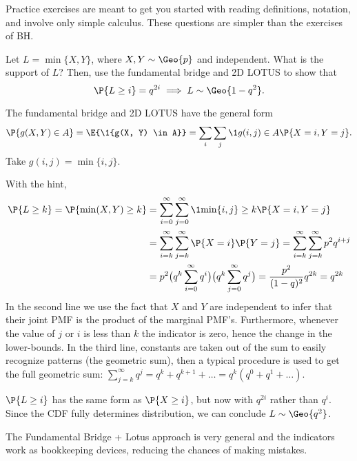 Practice exercises are meant to get you started with reading definitions, notation, and involve only simple calculus.
These questions are simpler than the exercises of BH.

\begin{exercise}
Let $L=\min\{X, Y\}$, where $X, Y\sim \Geo{p}$ and independent.
What is the support of $L$? Then, use the fundamental bridge and 2D LOTUS to show that
\begin{equation*}
\P{L\geq i}=q^{2i} \implies L\sim\Geo{1-q^{2}}.
\end{equation*}
\begin{hint}
The fundamental bridge and 2D LOTUS have  the general form
\begin{equation*}
\P{g(X,Y)\in A} = \E{\1{g(X, Y) \in A}} = \sum_{i}\sum_j \1{g(i, j)\in A} \P{X=i, Y=j}.
  \end{equation*}
Take  $g(i,j) = \min\{i, j\}$.
\end{hint}
\begin{solution}
With the hint,
  \begin{align*}
\P{L\geq k} = \P{\min(X, Y) \geq k}
&= \sum_{i=0}^\infty \sum_{j=0}^\infty \1{\min\{i,j\}\geq k} \P{X=i, Y=j}\\
&= \sum_{i=k}^\infty \sum_{j=k}^\infty \P{X=i}\P{Y=j} = \sum_{i=k}^\infty \sum_{j=k}^\infty p^2q^{i + j} \\
&= p^2 \big ( q^k \sum_{i=0}^\infty q^i \big) \big( q^k \sum_{j=0}^\infty q^j \big) = \frac{p^2}{(1 - q)^2} q^{2k} = q^{2k}
  \end{align*}
In the second line we use the fact that $X$ and $Y$ are independent to infer that their joint PMF is the product of the marginal PMF's.
Furthermore, whenever the value of $j$ or $i$ is less than $k$ the indicator is zero, hence the change in the lower-bounds.
In the third line, constants are taken out of the sum to easily recognize patterns (the geometric sum),
then a typical procedure is used to get the full geometric sum: $\sum_{j=k}^\infty q^j = q^k + q^{k+1} + \dots = q^k (q^0 + q^1 + \dots)$.

$\P{L\geq i}$ has the same form as $\P{X\geq i}$, but now with
$q^{2i}$ rather than $q^{i}$. Since the CDF fully determines
distribution, we can conclude $L\sim \Geo{q^2}$.

The Fundamental Bridge + Lotus approach is very general and the
indicators work as bookkeeping devices, reducing the chances of making
mistakes.


\end{solution}
\end{exercise}
